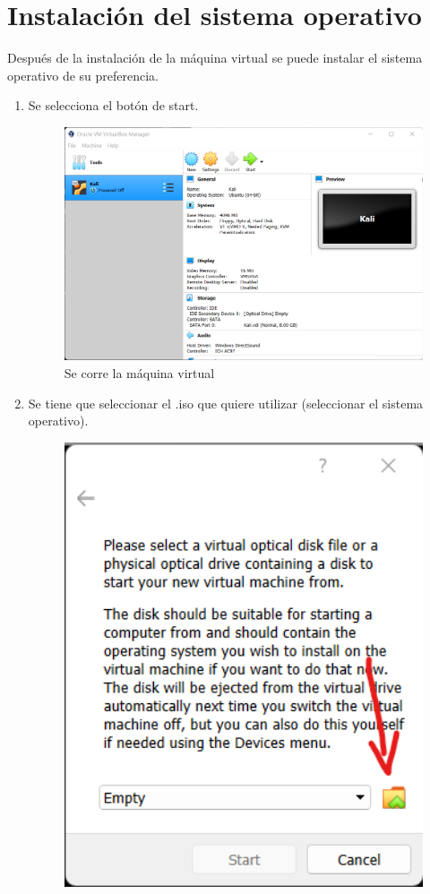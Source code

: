\documentclass[stu, 12pt, letterpaper, donotrepeattitle, floatsintext, natbib, helv]{apa7}
\begin{document}
\section*{Instalación del sistema operativo}
{}
Después de la instalación de la máquina virtual se puede instalar el sistema operativo de su preferencia.
\begin{enumerate}
    \item Se selecciona el botón de start.
    \begin{figure} [H]
        \includegraphics[width = 1\textwidth]{Start.png}
        \caption{Se corre la máquina virtual}
        \label{fig:Start}
    \end{figure}
    \item Se tiene que seleccionar el .iso que quiere utilizar (seleccionar el sistema operativo).
    \begin{figure} [H]
        \includegraphics[width = 1\textwidth]{SelectingISO1.png}

\end{figure}
\end{enumerate}
\end{document}
